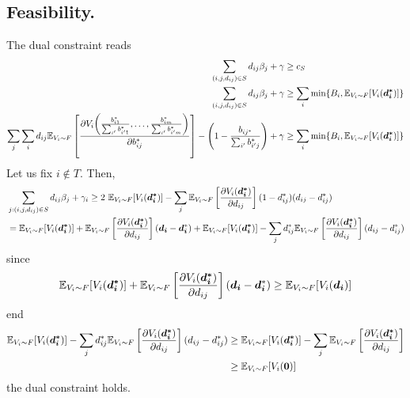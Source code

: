 \subsection{Feasibility.}

The dual constraint reads
\begin{align*}
    \sum_{(i,j,d_{ij}) \in S} d_{ij} \beta_j + \gamma &\geq c_{S} \\
    \sum_{(i,j,d_{ij}) \in S} d_{ij} \beta_j + \gamma &\geq \sum_{i} \min \{B_i, \mathbb{E}_{V_{i} \sim F}[V_i(\bm{d_i^*})] \}  \\
    \sum_{j} \sum_{i} d_{ij} \mathbb{E}_{V_{i} \sim F}\left[\frac{\partial V_i\biggl(\frac{b_{i1}^*}{\sum_{i'} b_{i'1}^*}, \dots, \frac{b_{im}^*}{\sum_{i'} b_{i'm}^*}\biggr)}{\partial b_{ij}^*}\right] - \left(1 - \frac{b_{ij^*}}{\sum_{i'}b_{i'j}^*} \right) + \gamma &\geq \sum_{i} \min \{B_i, \mathbb{E}_{V_{i} \sim F}[V_i(\bm{d_i^*})] \}  \\
\end{align*}
%
Let us fix $i \notin T$. Then,
%
\begin{align*}
    &\sum_{j : (i,j,d_{ij}) \in S} d_{ij} \beta_j + \gamma_i \geq 2 \ \mathbb{E}_{V_{i} \sim F}[V_{i}(\bm{d^{*}_{i}})] - \sum_{j} \mathbb{E}_{V_{i} \sim F}\left[\frac{\partial V_{i}(\bm{d^{*}_{i}})}{\partial d_{ij}}\right] (1 - d_{ij}^*)(d_{ij}-d_{ij}^*) \\
    &= \mathbb{E}_{V_{i} \sim F}[V_{i}(\bm{d^{*}_{i}})] + \mathbb{E}_{V_{i} \sim F}\left[\frac{\partial V_{i}(\bm{d^{*}_{i}})}{\partial d_{ij}}\right] (\bm{d_i} - \bm{d_i}^*) + \mathbb{E}_{V_{i} \sim F}[V_{i}(\bm{d^{*}_{i}})] - \sum_{j} d_{ij}^* \mathbb{E}_{V_{i} \sim F}\left[\frac{\partial V_{i}(\bm{d^{*}_{i}})}{\partial d_{ij}}\right] (d_{ij} - d_{ij}^*)
\end{align*}
%
since
%
\[
    \mathbb{E}_{V_{i} \sim F}[V_{i}(\bm{d^{*}_{i}})] + \mathbb{E}_{V_{i} \sim F}\left[\frac{\partial V_{i}(\bm{d^{*}_{i}})}{\partial d_{ij}}\right] (\bm{d_i} - \bm{d_i}^*) \ge \mathbb{E}_{V_{i} \sim F}[V_{i}(\bm{d_{i}})] \\
\]
%
end
\begin{align*}
    \mathbb{E}_{V_{i} \sim F}[V_{i}(\bm{d^{*}_{i}})] - \sum_{j} d_{ij}^* \mathbb{E}_{V_{i} \sim F}\left[\frac{\partial V_{i}(\bm{d^{*}_{i}})}{\partial d_{ij}}\right] (d_{ij} - d_{ij}^*)
    & \ge \mathbb{E}_{V_{i} \sim F}[V_{i}(\bm{d^{*}_{i}})] - \sum_{j} \mathbb{E}_{V_{i} \sim F}\left[\frac{\partial V_{i}(\bm{d^{*}_{i}})}{\partial d_{ij}}\right] \\
    & \ge \mathbb{E}_{V_{i} \sim F}[V_{i}(\bm{0})]
\end{align*}
%
the dual constraint holds.
